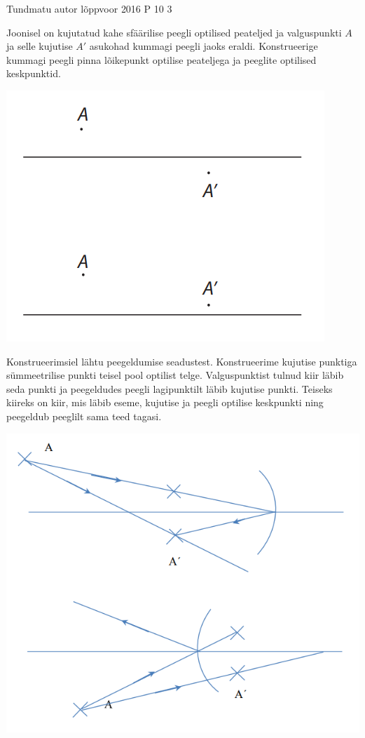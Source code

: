 {Tundmatu autor} %
{lõppvoor} %
{2016} %
{P 10} %
{3} %
{
\ifStatement
Joonisel on kujutatud kahe sfäärilise peegli optilised peateljed ja valguspunkti $A$ ja selle kujutise $A'$ asukohad kummagi peegli jaoks eraldi. Konstrueerige kummagi peegli pinna lõikepunkt optilise peateljega ja peeglite optilised keskpunktid.
\begin{center}
	\includegraphics[width=0.5\linewidth]{2016-v3p-10-yl.PNG}
\end{center}
\fi
\ifHint
Konstrueerimsiel lähtu peegeldumise seadustest.
\fi
\ifSolution
Konstrueerime kujutise punktiga sümmeetrilise punkti teisel pool optilist telge. Valguspunktist tulnud kiir läbib seda punkti ja peegeldudes peegli lagipunktilt läbib kujutise punkti. Teiseks kiireks on kiir, mis läbib eseme, kujutise ja peegli optilise keskpunkti ning peegeldub peeglilt sama teed tagasi.
\begin{center}
	\includegraphics[width=0.5\linewidth]{2016-v3p-10-lah.PNG}
\end{center}
\fi
}
